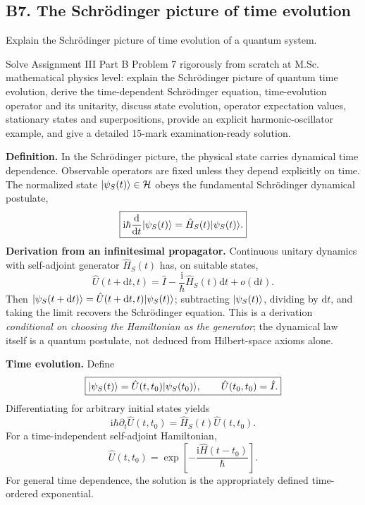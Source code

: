 \documentclass[11pt,a4paper]{article}
\newcommand{\dd}{\mathrm{d}}\newcommand{\iu}{\mathrm{i}}\newcommand{\ee}{\mathrm{e}}
\newcommand{\Hil}{\mathcal H}\newcommand{\R}{\mathbb R}\newcommand{\id}{\mathbb I}
\begin{document}
\subsection{B7. The Schr\"odinger picture of time evolution}
\begin{questionbox}
Explain the Schr\"odinger picture of time evolution of a quantum system.
\end{questionbox}
\begin{studybox}
Solve Assignment III Part B Problem 7 rigorously from scratch at M.Sc. mathematical physics level: explain the Schr\"odinger picture of quantum time evolution, derive the time-dependent Schr\"odinger equation, time-evolution operator and its unitarity, discuss state evolution, operator expectation values, stationary states and superpositions, provide an explicit harmonic-oscillator example, and give a detailed 15-mark examination-ready solution.
\end{studybox}
\textbf{Definition.} In the Schr\"odinger picture, the physical state carries dynamical time dependence. Observable operators are fixed unless they depend explicitly on time. The normalized state \(\ket{\psi_S(t)}\in\Hil\) obeys the fundamental Schr\"odinger dynamical postulate,
\begin{equation}\boxed{\iu\hbar\frac{\dd}{\dd t}\ket{\psi_S(t)}=\hat H_S(t)\ket{\psi_S(t)}.}\end{equation}
\textbf{Derivation from an infinitesimal propagator.} Continuous unitary dynamics with self-adjoint generator \(\hat H_S(t)\) has, on suitable states,
\begin{equation}\hat U(t+\dd t,t)=\hat I-\frac{\iu}{\hbar}\hat H_S(t)\dd t+o(\dd t).\end{equation}
Then \(\ket{\psi_S(t+\dd t)}=\hat U(t+\dd t,t)\ket{\psi_S(t)}\); subtracting \(|\psi_S(t)\rangle\), dividing by \(\dd t\), and taking the limit recovers the Schr\"odinger equation. This is a derivation \emph{conditional on choosing the Hamiltonian as the generator}; the dynamical law itself is a quantum postulate, not deduced from Hilbert-space axioms alone.

\textbf{Time evolution.} Define
\begin{equation}\boxed{|\psi_S(t)\rangle=\hat U(t,t_0)|\psi_S(t_0)\rangle,\qquad\hat U(t_0,t_0)=\hat I.}\end{equation}
Differentiating for arbitrary initial states yields
\begin{equation}\boxed{\iu\hbar\partial_t\hat U(t,t_0)=\hat H_S(t)\hat U(t,t_0).}\end{equation}
For a time-independent self-adjoint Hamiltonian,
\begin{equation}\boxed{\hat U(t,t_0)=\exp\!\left[-\frac{\iu\hat H(t-t_0)}{\hbar}\right].}\end{equation}
For general time dependence, the solution is the appropriately defined time-ordered exponential.
\end{document}

